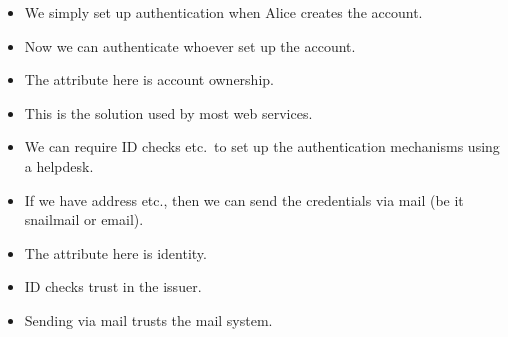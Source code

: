 \begin{frame}
  \begin{solution}
    \begin{itemize}
      \item We simply set up authentication when Alice creates the account.
      \item Now we can authenticate whoever set up the account.
    \end{itemize}
  \end{solution}

  \pause

  \begin{remark}
    \begin{itemize}
      \item The attribute here is account ownership.
    \end{itemize}
  \end{remark}

  \begin{example}
    \begin{itemize}
      \item This is the solution used by most web services.
    \end{itemize}
  \end{example}
\end{frame}

\begin{frame}
  \begin{solution}
    \begin{itemize}
      \item We can require ID checks etc.\ to set up the authentication 
        mechanisms using a helpdesk.

        \pause{}

      \item If we have address etc., then we can send the credentials via mail 
        (be it snailmail or email).

    \end{itemize}
  \end{solution}

  \pause

  \begin{remark}
    \begin{itemize}
      \item The attribute here is identity.
      \item ID checks trust in the issuer.
      \item Sending via mail trusts the mail system.
    \end{itemize}
  \end{remark}
\end{frame}

